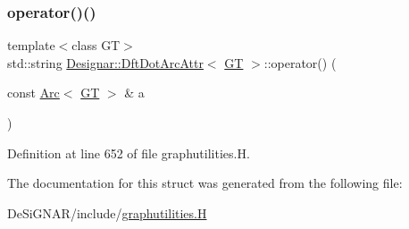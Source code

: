 \subsubsection{\texorpdfstring{operator()()}{operator()()}}
{\footnotesize\ttfamily template$<$class GT$>$ \\
std\+::string \hyperlink{struct_designar_1_1_dft_dot_arc_attr}{Designar\+::\+Dft\+Dot\+Arc\+Attr}$<$ \hyperlink{demo-buildgraph_8_c_a3001c40d2c31ca87ed96cd7d1334a55e}{GT} $>$\+::operator() (\begin{DoxyParamCaption}\item[{const \hyperlink{namespace_designar_a3f55fb5513d62ff47cbc8f72b8e95d6f}{Arc}$<$ \hyperlink{demo-buildgraph_8_c_a3001c40d2c31ca87ed96cd7d1334a55e}{GT} $>$ \&}]{a }\end{DoxyParamCaption})\hspace{0.3cm}{\ttfamily [inline]}}



Definition at line 652 of file graphutilities.\+H.



The documentation for this struct was generated from the following file\+:\begin{DoxyCompactItemize}
\item 
De\+Si\+G\+N\+A\+R/include/\hyperlink{graphutilities_8_h}{graphutilities.\+H}\end{DoxyCompactItemize}

